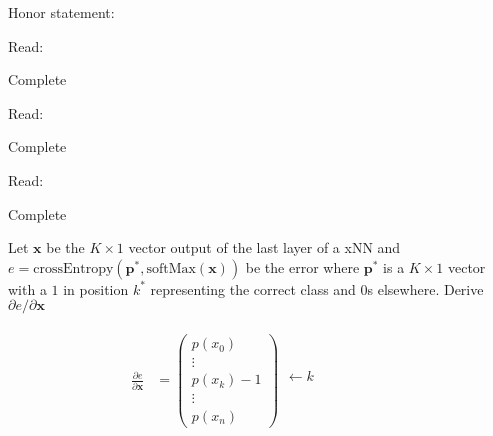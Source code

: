 \documentclass[11pt]{article}
\newcommand{\pd}{\partial}
\newcommand{\bs}{\boldsymbol}
\begin{document}
Honor statement:
\newline

\noindent
Read:
\begin{solution}
	Complete
\end{solution}

Read:
\begin{solution}
	Complete
\end{solution}

Read:
\begin{solution}
	Complete
\end{solution}

Let $\boldsymbol{x}$ be the $K \times 1$ vector output of the last layer of a
xNN and
$e = \text{crossEntropy}(\boldsymbol{p}^*,\text{softMax}(\boldsymbol{x}))$
be the error where $\boldsymbol{p}^*$ is a $K \times 1$ vector with a $1$ in
position $k^*$ representing the correct class and $0$s elsewhere. Derive
$\pd e/ \pd\boldsymbol{x}$

\begin{solution}
	\begin{align}
		\frac{\pd e}{\pd \bs{x}} &=
		\begin{pmatrix}
			p(x_{0}) \\
			\vdots \\
			p(x_{k})-1 \\
			\vdots \\
			p(x_{n})
		\end{pmatrix}
		\begin{matrix}
			\phantom{p(x_{0})} \\
			\phantom{\vdots} \\
			\leftarrow k \phantom{p(x_{k})-1} \\
			\phantom{\vdots} \\
			\phantom{p(x_{n})} \\
		\end{matrix}
	\end{align}
\end{solution}
\end{document}
